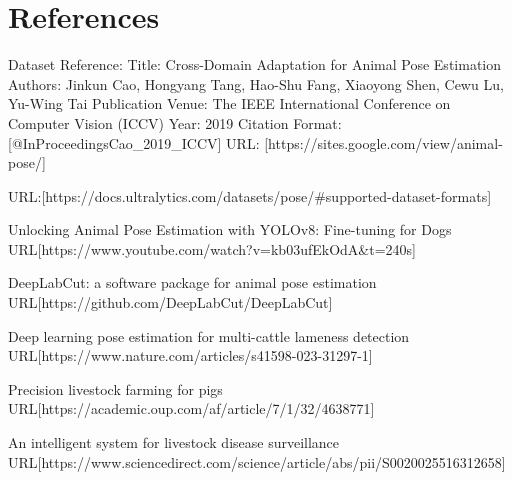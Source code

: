 \chapter{References}
\begin{hangparas}{4em}{1} %
Dataset Reference:\newline
Title: Cross-Domain Adaptation for Animal Pose Estimation\newline
Authors: Jinkun Cao, Hongyang Tang, Hao-Shu Fang, Xiaoyong Shen, Cewu Lu, Yu-Wing Tai\newline
Publication Venue: The IEEE International Conference on Computer Vision (ICCV)\newline
Year: 2019
\newline
Citation Format: [@InProceedings{Cao_2019_ICCV}]\newline
URL: [https://sites.google.com/view/animal-pose/]
\end{hangparas}
\newline
\newline
\begin{hangparas}{4em}{1} %
    URL:[https://docs.ultralytics.com/datasets/pose/#supported-dataset-formats]
\end{hangparas}
\newline
\newline
\begin{hangparas}{4em}{1} %
Unlocking Animal Pose Estimation with YOLOv8: Fine-tuning for Dogs\newline
URL[https://www.youtube.com/watch?v=kb03ufEkOdA&t=240s]
\end{hangparas}

\begin{hangparas}{4em}{1} %
DeepLabCut: a software package for animal pose estimation\newline
URL[https://github.com/DeepLabCut/DeepLabCut]
\end{hangparas}

\begin{hangparas}{4em}{1} %
Deep learning pose estimation for multi-cattle lameness detection\newline 
URL[https://www.nature.com/articles/s41598-023-31297-1]
\end{hangparas}

\begin{hangparas}{4em}{1} %
Precision livestock farming for pigs\newline 
URL[https://academic.oup.com/af/article/7/1/32/4638771]
\end{hangparas}

\begin{hangparas}{4em}{1} %
An intelligent system for livestock disease surveillance\newline 
URL[https://www.sciencedirect.com/science/article/abs/pii/S0020025516312658]
\end{hangparas}